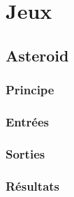 \documentclass{article}
\begin{document}
\section{Jeux}
\subsection{Asteroid}
\subsubsection{Principe}
\subsubsection{Entrées}
\subsubsection{Sorties}
\subsubsection{Résultats}
\end{document}
